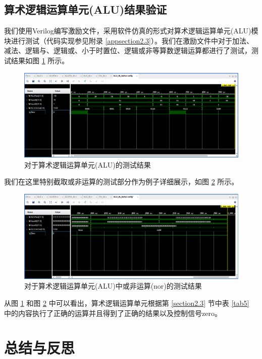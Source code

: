 \documentclass{cumcm}
\numberwithin{equation}{section}
\numberwithin{equation}{subsection}
\begin{document}
\subsection{算术逻辑运算单元(ALU)结果验证}\label{section4.3}

我们使用Verilog编写激励文件，采用软件仿真的形式对算术逻辑运算单元(ALU)模块进行测试（代码实现参见附录 \ref{appsection2.3}）。我们在激励文件中对于加法、减法、逻辑与、逻辑或、小于时置位、逻辑或非等算数逻辑运算都进行了测试，测试结果如图 \ref{fig3} 所示。

\begin{figure}[htbp]
    \centering
    \includegraphics[width=6.3in]{3.png}
    \caption{对于算术逻辑运算单元(ALU)的测试结果}
    \label{fig3}
\end{figure}

我们在这里特别截取或非运算的测试部分作为例子详细展示，如图 \ref{fig4} 所示。

\begin{figure}[htbp]
    \centering
    \includegraphics[width=6.3in]{4.png}
    \caption{对于算术逻辑运算单元(ALU)中或非运算(nor)的测试结果}
    \label{fig4}
\end{figure}

从图 \ref{fig3} 和图 \ref{fig4} 中可以看出，算术逻辑运算单元根据第 \ref{section2.3} 节中表 \ref{tab5} 中的内容执行了正确的运算并且得到了正确的结果以及控制信号zero。

\section{总结与反思}\label{section5}
\end{document}
